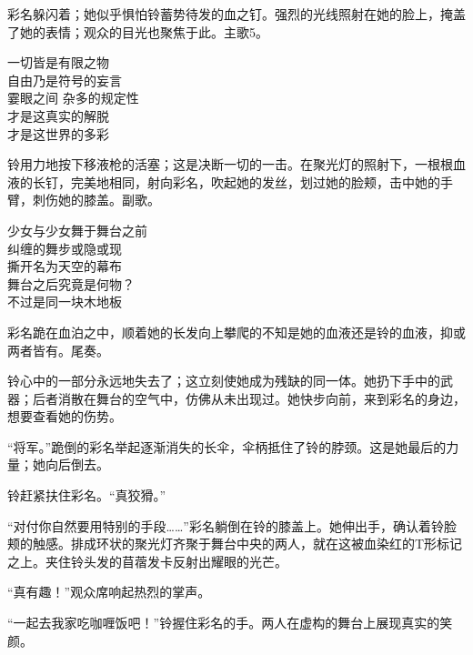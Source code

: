 彩名躲闪着；她似乎惧怕铃蓄势待发的血之钉。强烈的光线照射在她的脸上，掩盖了她的表情；观众的目光也聚焦于此。主歌5。
\begin{song}
一切皆是有限之物\\
自由乃是符号的妄言\\
霎眼之间 杂多的规定性\\
才是这真实的解脱\\
才是这世界的多彩
\end{song}

铃用力地按下移液枪的活塞；这是决断一切的一击。在聚光灯的照射下，一根根血液的长钉，完美地相同，射向彩名，吹起她的发丝，划过她的脸颊，击中她的手臂，刺伤她的膝盖。副歌。
\begin{song}
少女与少女舞于舞台之前\\
纠缠的舞步或隐或现\\
撕开名为天空的幕布\\
舞台之后究竟是何物？\\
不过是同一块木地板
\end{song}

彩名跪在血泊之中，顺着她的长发向上攀爬的不知是她的血液还是铃的血液，抑或两者皆有。尾奏。

铃心中的一部分永远地失去了；这立刻使她成为残缺的同一体。她扔下手中的武器；后者消散在舞台的空气中，仿佛从未出现过。她快步向前，来到彩名的身边，想要查看她的伤势。

“将军。”跪倒的彩名举起逐渐消失的长伞，伞柄抵住了铃的脖颈。这是她最后的力量；她向后倒去。

铃赶紧扶住彩名。“真狡猾。”

“对付你自然要用特别的手段……”彩名躺倒在铃的膝盖上。她伸出手，确认着铃脸颊的触感。排成环状的聚光灯齐聚于舞台中央的两人，就在这被血染红的T形标记之上。夹住铃头发的苜蓿发卡反射出耀眼的光芒。

“真有趣！”观众席响起热烈的掌声。

“一起去我家吃咖喱饭吧！”铃握住彩名的手。两人在虚构的舞台上展现真实的笑颜。
